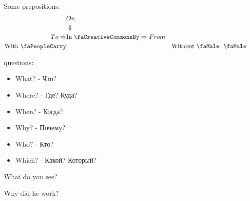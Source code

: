 \documentclass{tstextbook}
\begin{document}
\begin{theorem}
	\label{th: some_prepositions}
	Some prepositions:
	\begin{align*}
		& On \\
		& \Downarrow \\
		To \Rightarrow & \text{In \faCreativeCommonsBy} \Rightarrow From \\
		\text{With \faPeopleCarry}  && \text{Without \faMale \space \faMale }
	\end{align*}

\end{theorem}

\begin{theorem}
	\label{th: questions}
	questions:
	\begin{itemize}
		\item What? - Что?
		\item Where? - Где? Куда?
		\item When? - Когда?
		\item Why? - Почему?
		\item Who? - Кто?
		\item Which? - Какой? Который?
	\end{itemize}

	What do you see?
	
	Why did he work?
\end{theorem}
	
\end{document}
